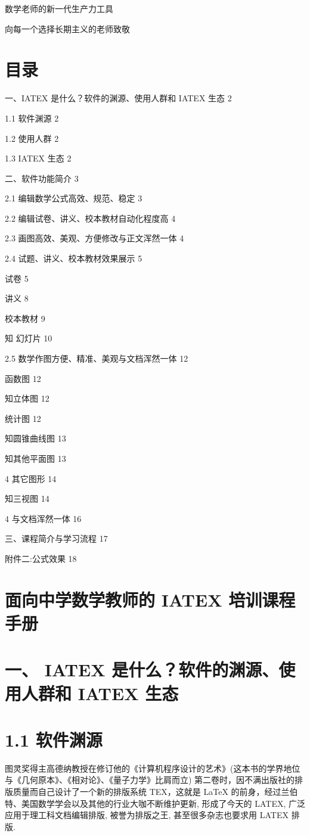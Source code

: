 \documentclass[10pt]{article}
\begin{document}
数学老师的新一代生产力工具

向每一个选择长期主义的老师致敬

\section*{目录}

一、IATEX 是什么？软件的渊源、使用人群和 IATEX 生态 2

1.1 软件渊源 2

1.2 使用人群 2

1.3 IATEX 生态 2

二、软件功能简介 3

2.1 编辑数学公式高效、规范、稳定 3

2.2 编辑试卷、讲义、校本教材自动化程度高 4

2.3 画图高效、美观、方便修改与正文浑然一体 4

2.4 试题、讲义、校本教材效果展示 5

试卷 5

讲义 8

校本教材 9

知 幻灯片 10

2.5 数学作图方便、精准、美观与文档浑然一体 12

函数图 12

知立体图 12

统计图 12

知圆锥曲线图 13

知其他平面图 13

4 其它图形 14

知三视图 14

4 与文档浑然一体 16

三、课程简介与学习流程 17

附件二:公式效果 18

\section*{面向中学数学教师的 IATEX 培训课程手册}

\section*{一、 IATEX 是什么？软件的渊源、使用人群和 IATEX 生态}

\section*{1.1 软件渊源}

图灵奖得主高德纳教授在修订他的《计算机程序设计的艺术》(这本书的学界地位与《几何原本》、《相对论》、《量子力学》比肩而立) 第二卷时，因不满出版社的排版质量而自己设计了一个新的排版系统 TEX，这就是 LaTeX 的前身，经过兰伯特、美国数学学会以及其他的行业大咖不断维护更新, 形成了今天的 LATEX, 广泛应用于理工科文档编辑排版, 被誉为排版之王, 甚至很多杂志也要求用 LATEX 排版.
\end{document}
